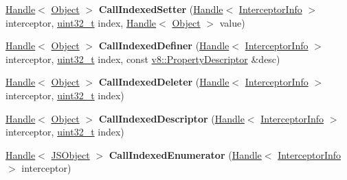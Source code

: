 \begin{DoxyCompactItemize}
\mbox{\hyperlink{classv8_1_1internal_1_1Handle}{Handle}}$<$ \mbox{\hyperlink{classv8_1_1internal_1_1Object}{Object}} $>$ {\bfseries Call\+Indexed\+Setter} (\mbox{\hyperlink{classv8_1_1internal_1_1Handle}{Handle}}$<$ \mbox{\hyperlink{classv8_1_1internal_1_1InterceptorInfo}{Interceptor\+Info}} $>$ interceptor, \mbox{\hyperlink{classuint32__t}{uint32\+\_\+t}} index, \mbox{\hyperlink{classv8_1_1internal_1_1Handle}{Handle}}$<$ \mbox{\hyperlink{classv8_1_1internal_1_1Object}{Object}} $>$ value)
\item 
\mbox{\label{classv8_1_1internal_1_1PropertyCallbackArguments_ac51937c77db1d1c632c60465fa21dcbb}} 
\mbox{\hyperlink{classv8_1_1internal_1_1Handle}{Handle}}$<$ \mbox{\hyperlink{classv8_1_1internal_1_1Object}{Object}} $>$ {\bfseries Call\+Indexed\+Definer} (\mbox{\hyperlink{classv8_1_1internal_1_1Handle}{Handle}}$<$ \mbox{\hyperlink{classv8_1_1internal_1_1InterceptorInfo}{Interceptor\+Info}} $>$ interceptor, \mbox{\hyperlink{classuint32__t}{uint32\+\_\+t}} index, const \mbox{\hyperlink{classv8_1_1PropertyDescriptor}{v8\+::\+Property\+Descriptor}} \&desc)
\item 
\mbox{\label{classv8_1_1internal_1_1PropertyCallbackArguments_ab4ba67f3098a5bba1d0475633e48d173}} 
\mbox{\hyperlink{classv8_1_1internal_1_1Handle}{Handle}}$<$ \mbox{\hyperlink{classv8_1_1internal_1_1Object}{Object}} $>$ {\bfseries Call\+Indexed\+Deleter} (\mbox{\hyperlink{classv8_1_1internal_1_1Handle}{Handle}}$<$ \mbox{\hyperlink{classv8_1_1internal_1_1InterceptorInfo}{Interceptor\+Info}} $>$ interceptor, \mbox{\hyperlink{classuint32__t}{uint32\+\_\+t}} index)
\item 
\mbox{\label{classv8_1_1internal_1_1PropertyCallbackArguments_a01db76274dbde953c51940409771f5b7}} 
\mbox{\hyperlink{classv8_1_1internal_1_1Handle}{Handle}}$<$ \mbox{\hyperlink{classv8_1_1internal_1_1Object}{Object}} $>$ {\bfseries Call\+Indexed\+Descriptor} (\mbox{\hyperlink{classv8_1_1internal_1_1Handle}{Handle}}$<$ \mbox{\hyperlink{classv8_1_1internal_1_1InterceptorInfo}{Interceptor\+Info}} $>$ interceptor, \mbox{\hyperlink{classuint32__t}{uint32\+\_\+t}} index)
\item 
\mbox{\label{classv8_1_1internal_1_1PropertyCallbackArguments_a18728dfbf99f79de87190ebc1b3ccc22}} 
\mbox{\hyperlink{classv8_1_1internal_1_1Handle}{Handle}}$<$ \mbox{\hyperlink{classv8_1_1internal_1_1JSObject}{J\+S\+Object}} $>$ {\bfseries Call\+Indexed\+Enumerator} (\mbox{\hyperlink{classv8_1_1internal_1_1Handle}{Handle}}$<$ \mbox{\hyperlink{classv8_1_1internal_1_1InterceptorInfo}{Interceptor\+Info}} $>$ interceptor)
\end{DoxyCompactItemize}
